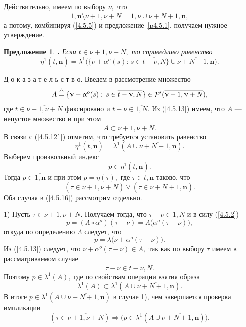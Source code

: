 \documentclass[11pt,twoside,openany]{report}
\newcommand{\bfn}{\begin{equation}}
\newcommand{\efn}{\end{equation}}
\newcommand{\df}{\stackrel{\triangle}{=}}
\newcommand{\ov}{\overline}
\newcounter{theo}
\newcounter{pred}
\newtheorem{pred}{Предложение}[section]
\newcommand{\TL}{\mbox{\bf{$\!\!$.}}}
\newcommand{\La}{\Lambda}
\newcommand{\la}{\lambda}
\newcommand{\al}{\alpha}
\newcommand{\cp}{{\cal P}}
\begin{document}
{{Действительно, имеем по выбору $\nu,$ что
$$
\ov{1,\mathbf{n}}\setminus \ov{\nu+1,\nu+N} = \ov{1,\nu} \cup \ov{\nu+N+1,\mathbf{n}},
$$
а потому, комбинируя (\ref{4.5.5}) и предложение~\ref{p4.5.1}, получаем нужное утверждение.
\begin{pred}\label{p4.5.2}
{\TL} Если $t\in \ov{\nu+1,\nu+N},$ то справедливо равенство
\bfn\label{4.5.12`}
\eta^1(\ov{t,\mathbf{n}}) = \la^1\bigl(\{\nu + \al^o(s):\,s\in \ov{t-\nu,N}\} \cup
\ov{\nu+N+1,\mathbf{n}}\bigl).
\efn
\end{pred}

Д о к а з а т е л ь с т в о. Введем в рассмотрение множество
\bfn\label{4.5.13}
A \df \{\nu +\al^o(s):\,s\in \ov{t-\nu,N}\}\in \cp^\prime(\ov{\nu+1,\nu+N}),
\efn
где $t\in \ov{\nu+1,\nu+N}$ фиксировано и $t-\nu\in \ov{1,N}.$ Из (\ref{4.5.13}) имеем,
что $A$ --- непустое множество и при этом
$$
A \subset \ov{\nu+1,\nu+N}.
$$
В связи с (\ref{4.5.12`}) отметим, что требуется установить равенство
\bfn\label{4.5.14}
\eta^1(\ov{t,\mathbf{n}}) = \la^1(A \cup \ov{\nu+N+1,\mathbf{n}}).
\efn
Выберем произвольный индекс
\bfn\label{4.5.15}
p\in \eta^1(\ov{t,\mathbf{n}}).
\efn
Тогда $p\in \ov{1,\mathbf{n}}$ и при этом $p=\eta(\tau),$ где
$\tau\in \ov{t,\mathbf{n}}$ таково, что
\bfn\label{4.5.16}
(\tau\in \ov{\nu+1,\nu+N}) \vee (\tau\in \ov{\nu+N+1,\mathbf{n}}).
\efn
Оба случая в (\ref{4.5.16}) рассмотрим отдельно.

1) Пусть $\tau\in \ov{\nu+1,\nu+N}.$ Получаем тогда, что $\tau- \nu\in \ov{1,N}$
и в силу (\ref{4.5.2})
$$
p = (\La \circ \al^o)(\tau-\nu) = \La\bigl(\al^o(\tau-\nu)\bigl),
$$
откуда по определению $\La$ следует, что
\bfn\label{4.5.17}
p = \la\bigl(\nu + \al^o(\tau-\nu)\bigl).
\efn
Из (\ref{4.5.13}) следует, что $\nu + \al^o(\tau-\nu) \in A,$ так как по выбору
$\tau$ имеем в рассматриваемом случае
$$
\tau-\nu \in \ov{t-\nu,N}.
$$
Поэтому $p\in \la^1(A),$ где по свойствам операции взятия образа
$$
\la^1(A) \subset \la^1(A \cup \ov{\nu+N+1,\mathbf{n}}).
$$
В итоге $p\in \la^1(A \cup \ov{\nu+N+1,\mathbf{n}})$ в случае 1), чем
завершается проверка импликации
\bfn\label{4.5.18}
(\tau\in \ov{\nu+1,\nu+N}) \Longrightarrow \bigl(p\in \la^1(A \cup
\ov{\nu+N+1,\mathbf{n}})\bigl).
\efn

}}
\end{document}
